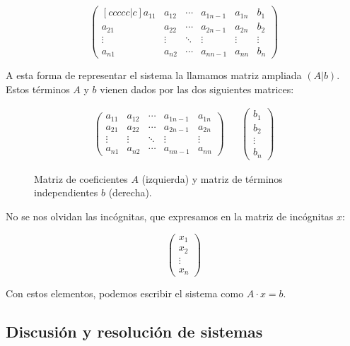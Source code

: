 \[
	\begin{pmatrix}[ccccc|c]
		a_{11} & a_{12} & \cdots & a_{1{n-1}} & a_{1n} & b_{1}  \\
		a_{21} & a_{22} & \cdots & a_{2{n-1}} & a_{2n} & b_{2}  \\
		\vdots & \vdots & \ddots & \vdots     & \vdots & \vdots \\
		a_{n1} & a_{n2} & \cdots & a_{n{n-1}} & a_{nn} & b_{n}
	\end{pmatrix}
\]

A esta forma de representar el sistema la llamamos matriz ampliada $(A|b)$.
Estos términos $A$ y $b$ vienen dados por las dos siguientes matrices:

\begin{figure}[h!]
\[
	\begin{array}{cccc}
		\begin{pmatrix}
			a_{11} & a_{12} & \cdots & a_{1{n-1}} & a_{1n} \\
			a_{21} & a_{22} & \cdots & a_{2{n-1}} & a_{2n} \\
			\vdots & \vdots & \ddots & \vdots     & \vdots \\
			a_{n1} & a_{n2} & \cdots & a_{n{n-1}} & a_{nn}
		\end{pmatrix}
		&&
		\begin{pmatrix}
			b_{1}  \\
			b_{2}  \\
			\vdots \\
			b_{n}
		\end{pmatrix}
	\end{array}
\]
\caption{Matriz de coeficientes $A$ (izquierda) y matriz de términos independientes $b$ (derecha).}
\end{figure}

No se nos olvidan las incógnitas, que expresamos en la matriz de incógnitas $x$:

\[
	\begin{pmatrix}
		x_{1}  \\
		x_{2}  \\
		\vdots \\
		x_{n}
	\end{pmatrix}
\]

Con estos elementos, podemos escribir el sistema como $A \cdot x = b$.

\subsection{Discusión y resolución de sistemas}\label{discusion-y-resolucion-de-sistemas}

